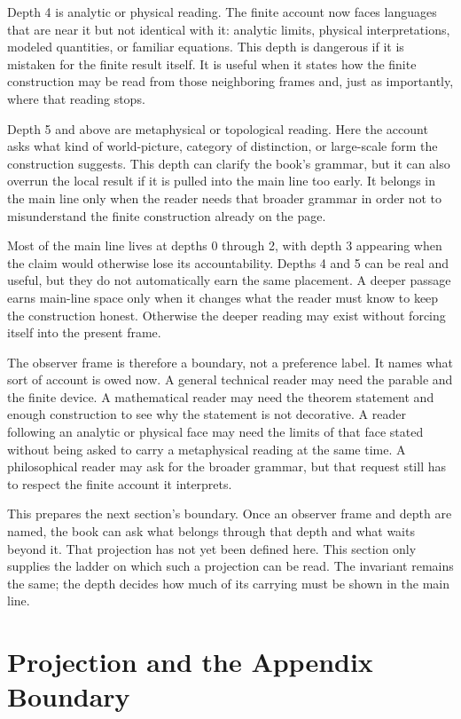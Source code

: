 Depth 4 is analytic or physical reading. The finite account now faces languages
that are near it but not identical with it: analytic limits, physical
interpretations, modeled quantities, or familiar equations. This depth is
dangerous if it is mistaken for the finite result itself. It is useful when it
states how the finite construction may be read from those neighboring frames
and, just as importantly, where that reading stops.

Depth 5 and above are metaphysical or topological reading. Here the account
asks what kind of world-picture, category of distinction, or large-scale form
the construction suggests. This depth can clarify the book's grammar, but it
can also overrun the local result if it is pulled into the main line too early.
It belongs in the main line only when the reader needs that broader grammar in
order not to misunderstand the finite construction already on the page.

Most of the main line lives at depths 0 through 2, with depth 3 appearing when
the claim would otherwise lose its accountability. Depths 4 and 5 can be real
and useful, but they do not automatically earn the same placement. A deeper
passage earns main-line space only when it changes what the reader must know to
keep the construction honest. Otherwise the deeper reading may exist without
forcing itself into the present frame.

The observer frame is therefore a boundary, not a preference label. It names
what sort of account is owed now. A general technical reader may need the
parable and the finite device. A mathematical reader may need the theorem
statement and enough construction to see why the statement is not decorative. A
reader following an analytic or physical face may need the limits of that face
stated without being asked to carry a metaphysical reading at the same time. A
philosophical reader may ask for the broader grammar, but that request still
has to respect the finite account it interprets.

This prepares the next section's boundary. Once an observer frame and depth are
named, the book can ask what belongs through that depth and what waits beyond
it. That projection has not yet been defined here. This section only supplies
the ladder on which such a projection can be read. The invariant remains the
same; the depth decides how much of its carrying must be shown in the main
line.

\section{Projection and the Appendix Boundary}

